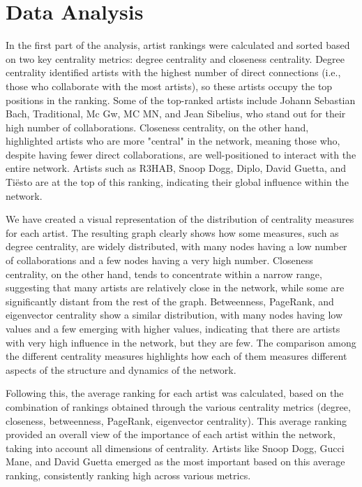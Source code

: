 \documentclass[a4paper, 12pt, conference]{ieeeconf}      %
\begin{document}
\section{Data Analysis}
In the first part of the analysis, artist rankings were calculated and sorted based on two key centrality metrics: degree centrality and closeness centrality. Degree centrality identified artists with the highest number of direct connections (i.e., those who collaborate with the most artists), so these artists occupy the top positions in the ranking. Some of the top-ranked artists include Johann Sebastian Bach, Traditional, Mc Gw, MC MN, and Jean Sibelius, who stand out for their high number of collaborations. Closeness centrality, on the other hand, highlighted artists who are more "central" in the network, meaning those who, despite having fewer direct collaborations, are well-positioned to interact with the entire network. Artists such as R3HAB, Snoop Dogg, Diplo, David Guetta, and Tiësto are at the top of this ranking, indicating their global influence within the network.

We have created a visual representation of the distribution of centrality measures for each artist. The resulting graph clearly shows how some measures, such as degree centrality, are widely distributed, with many nodes having a low number of collaborations and a few nodes having a very high number. Closeness centrality, on the other hand, tends to concentrate within a narrow range, suggesting that many artists are relatively close in the network, while some are significantly distant from the rest of the graph. Betweenness, PageRank, and eigenvector centrality show a similar distribution, with many nodes having low values and a few emerging with higher values, indicating that there are artists with very high influence in the network, but they are few. The comparison among the different centrality measures highlights how each of them measures different aspects of the structure and dynamics of the network.

Following this, the average ranking for each artist was calculated, based on the combination of rankings obtained through the various centrality metrics (degree, closeness, betweenness, PageRank, eigenvector centrality). This average ranking provided an overall view of the importance of each artist within the network, taking into account all dimensions of centrality. Artists like Snoop Dogg, Gucci Mane, and David Guetta emerged as the most important based on this average ranking, consistently ranking high across various metrics.
\end{document}
